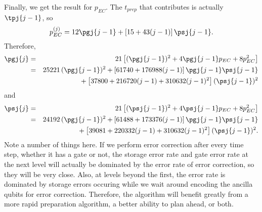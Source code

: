 Finally, we get the result for $p_{EC}$.  The $t_{prep}$ that contributes is
actually $\tpj{j-1}$, so
\begin{equation}
	p_{EC}^{(j)} = 12 \pgj{j-1} + [15 + 43 (j-1)]\,\psj{j-1}.
\end{equation}
Therefore,
\begin{eqnarray}
	\pgj{j} & = & 21 \left[(\pgj{j-1})^2 + 4 \pgj{j-1} p_{EC} + 8 p_{EC}^2
	\right] \\
	& = & 25221\,(\pgj{j-1})^2 + \left[61740 + 176988 (j-1) \right] \pgj{j-1}
	\psj{j-1} \nonumber \\
	& & \mbox{} + \left[37800 + 216720 (j-1) + 310632 (j-1)^2 \right] (\psj{j-1})^2
\end{eqnarray}
and
\begin{eqnarray}
	\psj{j} & = & 21 \left[(\psj{j-1})^2 + 4 \psj{j-1} p_{EC} + 8 p_{EC}^2
	\right] \\
	& = & 24192\,(\pgj{j-1})^2 + \left[61488 + 173376 (j-1) \right] \pgj{j-1}
	\psj{j-1} \nonumber \\
	& & \mbox{} + \left[39081 + 220332 (j-1) + 310632 (j-1)^2 \right] (\psj{j-1})^2.
\end{eqnarray}
Note a number of things here.  If we perform error correction after every
time step, whether it has a gate or not, the storage error rate and gate
error rate at the next level will actually be dominated by the error rate of
error correction, so they will be very close.  Also, at levels beyond the
first, the error rate is dominated by storage errors occuring while we wait
around encoding the ancilla qubits for error correction.  Therefore, the
algorithm will benefit greatly from a more rapid preparation algorithm, a
better ability to plan ahead, or both.

